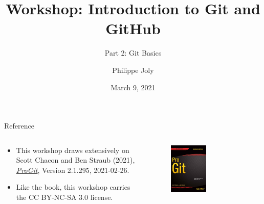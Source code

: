 \documentclass[handout]{beamer}
\title[Git/GitHub Workshop: Part 2]{Workshop: Introduction to Git and GitHub}
\subtitle{Part 2: Git Basics}
\author[P. Joly]{Philippe Joly}
\institute[FU-Berlin]{Freie Universität Berlin}
\date{March 9, 2021}
\begin{document}
\begin{frame}
\titlepage
\end{frame}
%

%
%


\begin{frame}{Reference}
	\begin{columns}
	
		\begin{column}{0.5\textwidth}
			\begin{itemize}
				\item This workshop draws extensively on Scott Chacon and Ben Straub (2021), \href{https://git-scm.com/book/en/v2}{\textit{ProGit}}, Version 2.1.295, 2021-02-26. 
				\item Like the book, this workshop carries the CC BY-NC-SA 3.0 license.
			\end{itemize}
		\end{column}
		
		\begin{column}{0.5\textwidth}
			\begin{figure}
				\includegraphics[width=0.5\textwidth]{figures/progit_cover.png}
				\caption{}
			\end{figure}
		\end{column}
	
	\end{columns}
\end{frame}
\end{document}
